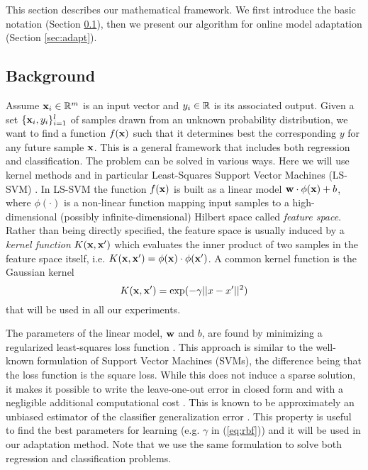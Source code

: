 This section describes our mathematical framework. We first introduce
the basic notation (Section \ref{sec:back}), then we present our algorithm
for online model adaptation (Section \ref{sec:adapt}).

\subsection{Background}
\label{sec:back}

Assume $\mathbf{x}_i \in \mathbb{R}^m$ is an input vector and $y_i \in \mathbb{R}$ is its
associated output.  Given a set $\{\mathbf{x}_i,y_i\}_{i=1}^l$ of samples
drawn from an unknown probability distribution, we want to find a
function $f(\mathbf{x})$ such that it determines best
the corresponding 
$y$ for any future sample $\mathbf{x}$.
This is a general framework that includes both regression and
classification. The problem can be solved in various
ways. Here we will use kernel methods and in particular Least-Squares
Support Vector Machines (LS-SVM) \cite{Cristianini00}. In LS-SVM the
function $f(\mathbf{x})$ is built as a linear model $\mathbf{w} \cdot \phi(\mathbf{x}) +
b$, where $\phi(\cdot)$ is a non-linear function mapping input samples
to a high-dimensional (possibly infinite-dimensional) Hilbert space
called \emph{feature space}. Rather than being directly specified, the
feature space is usually induced by a \emph{kernel function}
$K(\mathbf{x},\mathbf{x}')$ which evaluates the inner product of two samples in the
feature space itself,
i.e. $K(\mathbf{x},\mathbf{x}')=\phi(\mathbf{x}) \cdot \phi(\mathbf{x}')$. A common kernel
function is the Gaussian kernel
\begin{equation}
  K(\mathbf{x},\mathbf{x}')=\exp(-\gamma ||x-x'||^2)
  \label{eq:rbf}
\end{equation}
\noindent that will be used in all our experiments.

The parameters of the linear model, $\mathbf{w}$ and $b$, are found by
minimizing a regularized least-squares loss function
\cite{Cristianini00}. This approach is similar to the well-known
formulation of Support Vector Machines (SVMs), the difference being
that the loss function is the square loss.
While this does not induce a sparse solution,
it makes it possible to write the leave-one-out error in closed form and with a negligible additional computational cost \cite{Rifkin07}. This is known to be approximately an unbiased
estimator of the classifier generalization error \cite{LuntzB69}. This
property is useful to find the best parameters for learning
(e.g. $\gamma$ in (\ref{eq:rbf})) and it will be used in our
adaptation method. Note that we use the same formulation to solve both
regression and classification problems.

